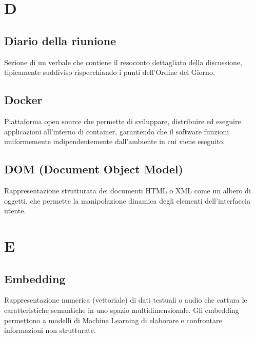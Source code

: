 \documentclass[a4paper, 11pt, oneside]{scrartcl} %
\begin{document}

\section*{D}


\subsection*{Diario della riunione}


Sezione di un verbale che contiene il resoconto dettagliato della discussione, tipicamente suddiviso rispecchiando i punti dell'Ordine del Giorno.

\vspace{0.5cm}

\subsection*{Docker}
Piattaforma open source che permette di sviluppare, distribuire ed eseguire applicazioni all'interno di container, garantendo che il software funzioni uniformemente indipendentemente dall'ambiente in cui viene eseguito.
\vspace{0.5cm}

\subsection*{DOM (Document Object Model)}
Rappresentazione strutturata dei documenti HTML o XML come un albero di oggetti, che permette la manipolazione dinamica degli elementi dell'interfaccia utente.
\vspace{0.5cm}


\section*{E}


\subsection*{Embedding}
Rappresentazione numerica (vettoriale) di dati testuali o audio che cattura le caratteristiche semantiche in uno spazio multidimensionale. Gli embedding permettono a modelli di Machine Learning di elaborare e confrontare informazioni non strutturate.
\vspace{0.5cm}
\end{document}
